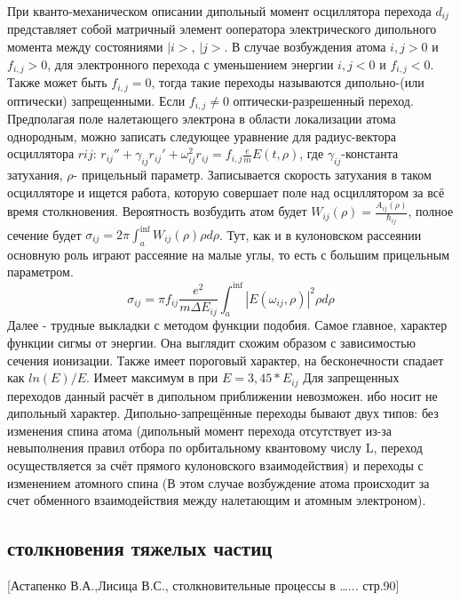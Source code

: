 \documentclass[10pt, a4paper]{article}
\begin{document}
При кванто-механическом описании дипольный момент осциллятора перехода $d_{ij}$ представляет собой матричный элемент ооператора электрического дипольного момента между состояниями $|i>$, $|j>$. В случае возбуждения атома $i,j>0$ и $f_{i,j}>0$, для электронного перехода с уменьшением энергии $i,j<0$ и $f_{i,j}<0$. Также может быть $f_{i,j}=0$, тогда такие переходы называются дипольно-(или оптически) запрещенными. Если  $f_{i,j} \ne 0$ оптически-разрешенный переход.
Предполагая поле налетающего электрона в области локализации атома однородным, можно записать следующее уравнение для радиус-вектора осциллятора $rij$:
$r_{ij}''+\gamma_{ij}r_{ij}'+\omega_{ij}^{2}r_{ij}=f_{i,j}\frac{e}{m}E(t,\rho)$, где $\gamma_{ij}$-константа затухания,  $\rho$- прицельный параметр. Записывается скорость затухания в таком осцилляторе и ищется работа, которую совершает поле над осциллятором за всё время столкновения.
Вероятность возбудить атом будет $W_{ij}(\rho)=\frac {A_{ij}(\rho)}{\hbar_{ij}}$, полное сечение  будет $\sigma_{ij}=2\pi \int_{a}^{\inf} W_{ij}(\rho)\rho d\rho$. Тут, как и в кулоновском рассеянии основную роль играют рассеяние на малые углы, то есть с большим прицельным параметром.
\begin{equation}
\sigma_{ij}=\pi f_{ij} \frac {e^{2}}{m\Delta E_{ij} } \int_{a}^{\inf} |E(\omega_{ij},\rho)|^{2} \rho d\rho
\end{equation}
Далее - трудные выкладки с методом функции подобия. Самое главное, характер функции сигмы от энергии. Она выглядит схожим образом с зависимостью сечения ионизации. Также имеет пороговый характер, на бесконечности спадает как $ln(E)/E$. Имеет максимум в при $E=3,45*E_{ij}$
Для запрещенных переходов данный расчёт в дипольном приближении невозможен. ибо носит не дипольный характер. Дипольно-запрещённые переходы бывают двух типов: без изменения спина атома (дипольный момент перехода отсутствует из-за невыполнения правил отбора по орбитальному квантовому числу L, переход осуществляется за счёт прямого кулоновского взаимодействия) и переходы с изменением атомного спина (В этом случае возбуждение атома происходит за счет обменного взаимодействия между налетающим и атомным электроном).



\subsection{столкновения тяжелых частиц}
\label{sec.2.4}


[Астапенко В.А.,Лисица В.С., столкновительные процессы в …... стр.90]
\end{document}
